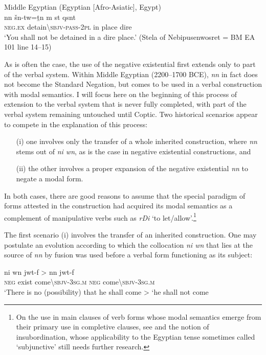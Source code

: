 \documentclass[output=paper,draft,draftmode,colorlinks,citecolor=brown]{langscibook}
\begin{document}
\ea Middle Egyptian (Egyptian [Afro-Asiatic], Egypt) \label{ex:AE34}\\
    \gll nn šn{\ꜥ}-tw=ṯn m st qsnt \\
    \textsc{neg.ex} detain\textbackslash\textsc{sbjv-pass-2pl} in place dire\\ 
    \glt ‘You shall not be detained in a dire place.’ (Stela of Nebipusenwosret = BM EA 101 line 14–15) 
\z 

As is often the case, the use of the negative existential first extends only to part of the verbal system. Within Middle Egyptian (2200–1700 BCE), \textit{nn} in fact does not become the Standard Negation, but comes to be used in a verbal construction with modal semantics. I will focus here on the beginning of this process of extension to the verbal system that is never fully completed, with part of the verbal system remaining untouched until Coptic. Two historical scenarios appear to compete in the explanation of this process: 

\begin{enumerate}
    \item[(i)] one involves only the transfer of a whole inherited construction, where \textit{nn} stems out of \textit{ni wn}, as is the case in negative existential constructions, and
    \item[(ii)] the other involves a proper expansion of the negative existential \textit{nn} to negate a modal form.
\end{enumerate}
 
In both cases, there are good reasons to assume that the special paradigm of forms attested in the construction had acquired its modal semantics as a complement of manipulative verbs such as \textit{rDi} ‘to let/allow’.\footnote{On the use in main clauses of verb forms whose modal semantics emerge from their primary use in completive clauses, see \citet{Evans2007} and the notion of insubordination, whose applicability to the Egyptian tense sometimes called ‘subjunctive’ still needs further research. }

The first scenario (i) involves the transfer of an inherited construction. One may postulate an evolution according to which the collocation \textit{ni wn} that lies at the source of \textit{nn} by fusion was used before a verbal form functioning as its subject:  

\ea \label{ex:AE35}
    \gll *ni wn jwt-f > nn jwt-f \\
    \textsc{neg} exist come\textbackslash\textsc{sbjv-3sg.m} { } \textsc{neg} come\textbackslash\textsc{sbjv-3sg.m}\\ 
    \glt ‘There is no (possibility) that he shall come > ‘he shall not come 
\z 
\end{document}
